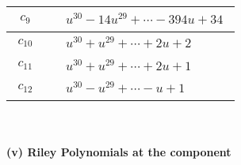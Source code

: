 \documentclass[1p]{elsarticle_modified}
\theoremstyle{definition}
\begin{document}
\begin{tabular}{m{50pt}|m{274pt}}
\hline $$\begin{aligned}c_{9}\end{aligned}$$&$\begin{aligned}
&u^{30}-14 u^{29}+\cdots-394 u+34
\end{aligned}$\\
\hline $$\begin{aligned}c_{10}\end{aligned}$$&$\begin{aligned}
&u^{30}+u^{29}+\cdots+2 u+2
\end{aligned}$\\
\hline $$\begin{aligned}c_{11}\end{aligned}$$&$\begin{aligned}
&u^{30}+u^{29}+\cdots+2 u+1
\end{aligned}$\\
\hline $$\begin{aligned}c_{12}\end{aligned}$$&$\begin{aligned}
&u^{30}- u^{29}+\cdots- u+1
\end{aligned}$\\
\hline
\end{tabular}\\~\\
\newpage\renewcommand{\arraystretch}{1}
\flushleft \textbf{(v) Riley Polynomials at the component}\newline \\
\end{document}
